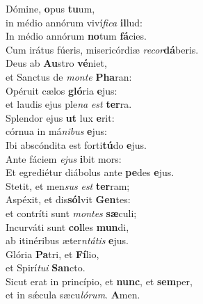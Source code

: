 \evenverse Dómine, \textbf{o}pus \textbf{tu}um,~\*\\
\evenverse in médio annórum viví\textit{fi}\textit{ca} \textbf{il}lud:\\
\oddverse In médio annórum \textbf{no}tum \textbf{fá}cies.~\*\\
\oddverse Cum irátus fúeris, misericórdiæ \textit{re}\textit{cor}\textbf{dá}beris.\\
\evenverse Deus ab \textbf{Au}stro \textbf{vé}niet,~\*\\
\evenverse et Sanctus de \textit{mon}\textit{te} \textbf{Pha}ran:\\
\oddverse Opéruit cælos \textbf{gló}ria \textbf{e}jus:~\*\\
\oddverse et laudis ejus ple\textit{na} \textit{est} \textbf{ter}ra.\\
\evenverse Splendor ejus \textbf{ut} lux \textbf{e}rit:~\*\\
\evenverse córnua in má\textit{ni}\textit{bus} \textbf{e}jus:\\
\oddverse Ibi abscóndita est forti\textbf{tú}do \textbf{e}jus.~\*\\
\oddverse Ante fáciem \textit{e}\textit{jus} \textbf{i}bit mors:\\
\evenverse Et egrediétur diábolus ante \textbf{pe}des \textbf{e}jus.~\*\\
\evenverse Stetit, et men\textit{sus} \textit{est} \textbf{ter}ram;\\
\oddverse Aspéxit, et dis\textbf{sól}vit \textbf{Gen}tes:~\*\\
\oddverse et contríti sunt \textit{mon}\textit{tes} \textbf{sæ}culi;\\
\evenverse Incurváti sunt \textbf{col}les \textbf{mun}di,~\*\\
\evenverse ab itinéribus æter\textit{ntá}\textit{tis} \textbf{e}jus.\\
\oddverse Glória \textbf{Pa}tri, et \textbf{Fí}lio,~\*\\
\oddverse et Spirí\textit{tu}\textit{i} \textbf{San}cto.\\
\evenverse Sicut erat in princípio, et \textbf{nunc}, et \textbf{sem}per,~\*\\
\evenverse et in sǽcula sæcu\textit{ló}\textit{rum}. \textbf{A}men.\\
